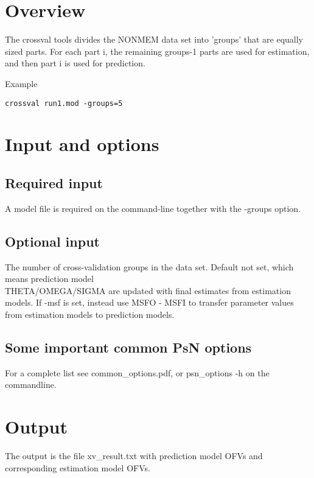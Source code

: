 



\maketitle
\newcommand{\guidetoolname}{crossval}


\section{Overview}

The crossval tools divides the NONMEM data set into 'groups' that are equally sized parts.
For each part i, the remaining groups-1 parts are used for estimation,
and then part i is used for prediction.

Example
\begin{verbatim}
crossval run1.mod -groups=5
\end{verbatim}

\section{Input and options}
	
\subsection{Required input}
A model file is required on the command-line together with the -groups option.
		
\subsection{Optional input}
			
\begin{optionlist}
The number of cross-validation groups in the data set.
\nextopt
{}
Default not set, which means prediction model\\
THETA/OMEGA/SIGMA are updated with final estimates from estimation models.
If -msf is set, instead use MSFO - MSFI to transfer parameter values from estimation models to prediction models.
\nextopt
\end{optionlist}

\subsection{Some important common PsN options}
For a complete list see common\_options.pdf, 
or psn\_options -h on the commandline.


\section{Output}

The output is the file xv\_result.txt with prediction model OFVs and
corresponding estimation model OFVs.


